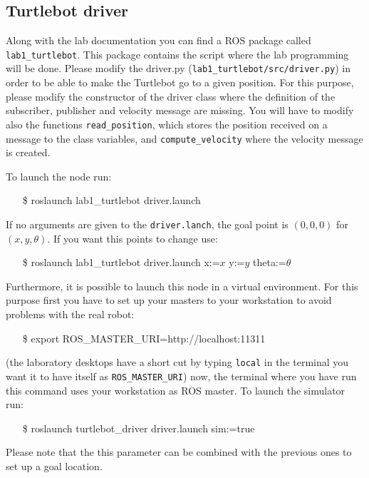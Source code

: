 \documentclass[a4paper,10pt]{article}
\begin{document}
\subsection{Turtlebot driver}
Along with the lab documentation you can find a ROS package called \texttt{lab1\_turtlebot}. This package contains the script where the lab programming will be done. Please modify the driver.py (\texttt{lab1\_turtlebot/src/driver.py}) in order to be able to make the Turtlebot go to a given position. For this purpose, please modify the constructor of the driver class where the definition of the subscriber, publisher and velocity message are missing. You will have to modify also the functions \texttt{read\_position}, which stores the position received on a message to the class variables, and \texttt{compute\_velocity} where the velocity message is created.

To launch the node run:
\begin{shaded}
	\begin{itemize}
		\item[\$] roslaunch lab1\_turtlebot driver.launch
	\end{itemize}
\end{shaded}
If no arguments are given to the \texttt{driver.lanch}, the goal point is $(0,0,0)$ for $(x,y,\theta)$. If you want this points to change use:
\begin{shaded}
	\begin{itemize}
		\item[\$] roslaunch lab1\_turtlebot driver.launch x:=$x$ y:=$y$ theta:=$\theta$
	\end{itemize}
\end{shaded}
Furthermore, it is possible to launch this node in a virtual environment. For this purpose first you have to set up your masters to your workstation to avoid problems with the real robot:
\begin{shaded}
	\begin{itemize}
		\item[\$] export ROS\_MASTER\_URI=http://localhost:11311
	\end{itemize}
\end{shaded}
(the laboratory desktops have a short cut by typing \texttt{local} in the terminal you want it to have itself as \texttt{ROS\_MASTER\_URI}) now, the terminal where you have run this command uses your workstation as ROS master. To launch the simulator run:
\begin{shaded}
	\begin{itemize}
		\item[\$] roslaunch turtlebot\_driver driver.launch sim:=true
	\end{itemize}
\end{shaded}
Please note that the this parameter can be combined with the previous ones to set up a goal location.
\end{document}

